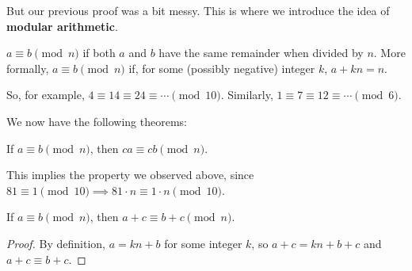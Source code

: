 \documentclass[a4paper]{scrartcl}
\begin{document}
But our previous proof was a bit messy. This is where we introduce the idea of \textbf{modular arithmetic}.

\begin{definition}
$a \equiv b \pmod{n}$ if both $a$ and $b$ have the same remainder when divided by $n$. More formally, $a \equiv b \pmod{n}$ if, for some (possibly negative) integer $k$, $a + kn = n$.
\end{definition}

So, for example, $4 \equiv 14 \equiv 24 \equiv \cdots \pmod{10}$.
Similarly, $1 \equiv 7 \equiv 12 \equiv \cdots \pmod{6}$.

We now have the following theorems:
\begin{theorem}
	If $a \equiv b \pmod{n}$, then $ca \equiv cb \pmod{n}$.
\end{theorem}
This implies the property we observed above, since $81 \equiv 1 \pmod{10} \implies 81 \cdot n \equiv 1 \cdot n \pmod{10}$.
\begin{theorem}
	If $a \equiv b \pmod{n}$, then $a + c \equiv b + c \pmod{n}$.
\end{theorem}
\begin{proof}
	By definition, $a = kn + b$ for some integer $k$, so $a + c = kn + b + c$ and $a + c \equiv b + c$.
\end{proof}
\end{document}
